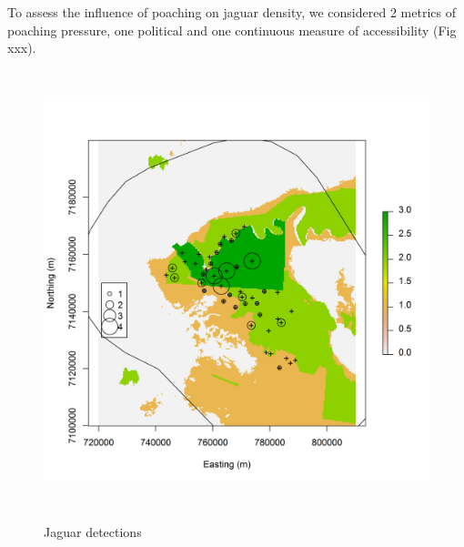 To assess the influence of poaching on jaguar density, we considered 2
metrics of poaching pressure, one political and one continuous measure
of accessibility (Fig xxx).









\begin{figure}
\centering
\includegraphics[width=5in,height=5in]{figs/jaguarCountMap}
\label{ch9:fig:jaguarCts}
\caption{Jaguar detections}
\end{figure}




